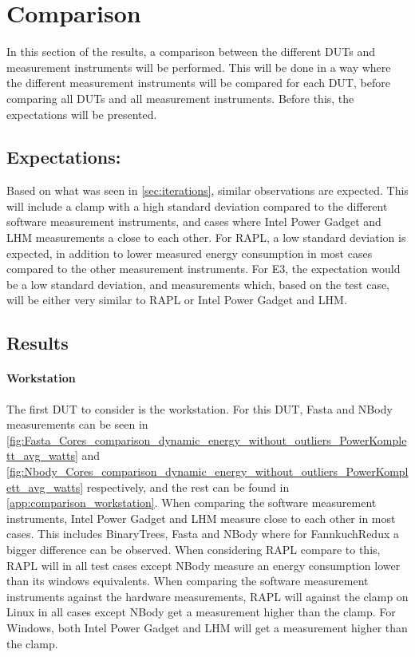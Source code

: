 \section{Comparison}\label{sec:comparison}

In this section of the results, a comparison between the different DUTs and measurement instruments will be performed. This will be done in a way where the different measurement instruments will be compared for each DUT, before comparing all DUTs and all measurement instruments. Before this, the expectations will be presented.

\subsection{Expectations:} Based on what was seen in \cref{sec:iterations}, similar observations are expected. This will include a clamp with a high standard deviation compared to the different software measurement instruments, and cases where Intel Power Gadget and LHM measurements a close to each other. For RAPL, a low standard deviation is expected, in addition to lower measured energy consumption in most cases compared to the other measurement instruments. For E3, the expectation would be a low standard deviation, and measurements which, based on the test case, will be either very similar to RAPL or Intel Power Gadget and LHM.

\subsection{Results}
\paragraph{Workstation}




The first DUT to consider is the workstation. For this DUT, Fasta and NBody measurements can be seen in \cref{fig:Fasta_Cores_comparison_dynamic_energy_without_outliers_PowerKomplett_avg_watts} and \cref{fig:Nbody_Cores_comparison_dynamic_energy_without_outliers_PowerKomplett_avg_watts} respectively, and the rest can be found in \cref{app:comparison_workstation}. When comparing the software measurement instruments, Intel Power Gadget and LHM measure close to each other in most cases. This includes BinaryTrees, Fasta and NBody where for FannkuchRedux a bigger difference can be observed. When considering RAPL compare to this, RAPL will in all test cases except NBody measure an energy consumption lower than its windows equivalents. When comparing the software measurement instruments against the hardware measurements, RAPL will against the clamp on Linux in all cases except NBody get a measurement higher than the clamp. For Windows, both Intel Power Gadget and LHM will get a measurement higher than the clamp.

